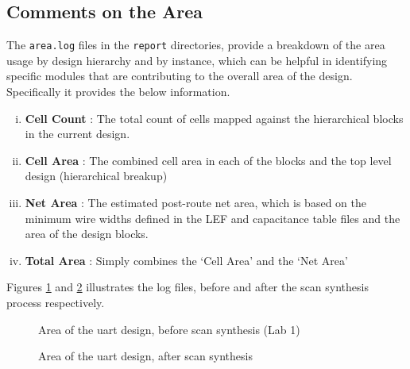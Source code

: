 \documentclass[a4paper,11pt]{article}%
\begin{document}
\subsection{Comments on the Area}

The {\tt area.log} files in the {\tt report} directories, provide a breakdown of the area usage by design hierarchy and by instance, which can be helpful in identifying specific modules that are contributing to the overall area of the design. Specifically it provides the below information\cite{genus_command_ref_2019}. 

\begin{enumerate}[i.]
	\item \textbf{{Cell Count}} : The total count of cells mapped against the hierarchical blocks in the current design.
	
	\item \textbf{{Cell Area}} : The combined cell area in each of the blocks and the top level design (hierarchical breakup)
	
	\item \textbf{{Net Area}} : The estimated post-route net area, which is based on the minimum wire widths defined in the LEF and capacitance table files and the area of the design blocks.
	
	\item \textbf{{Total Area}} : Simply combines the `Cell Area' and the `Net Area'
\end{enumerate}


Figures \ref{fig:area_lab1} and \ref{fig:area_after_scan_synthesis} illustrates the log files, before and after the scan synthesis process respectively.


\begin{figure}[h]
	\centering
	\caption{Area of the \ac{uart} design, before scan synthesis (Lab 1)}
	\label{fig:area_lab1}
\end{figure}

\begin{figure}[h]
	\centering
	\caption{Area of the \ac{uart} design, after scan synthesis}
	\label{fig:area_after_scan_synthesis}
\end{figure}
\end{document}
